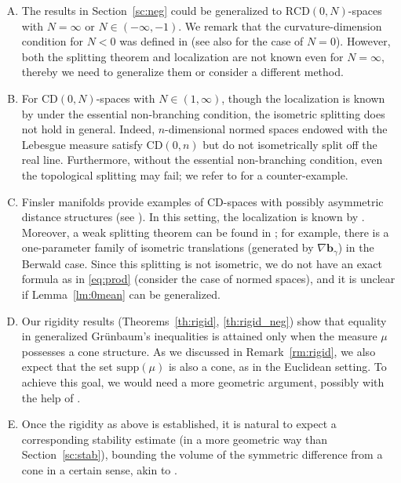 \documentclass[sts]{imsart}
\theoremstyle{definition}
\theoremstyle{remark}
\newcommand{\bb}{\mathbf{b}}
\newcommand{\dist}{\mathrm{d}}
\newcommand{\ve}{\varepsilon}
\newcommand{\CD}{\mathrm{CD}}
\newcommand{\RCD}{\mathrm{RCD}}
\newcommand{\supp}{\mathrm{supp}}
\newcommand*\diff{\mathop{}\!\mathrm{d}}
\begin{document}
\begin{enumerate}[(A)]
\item
The results in Section~\ref{sc:neg} could be generalized to $\RCD(0,N)$-spaces with $N=\infty$ or $N \in (-\infty,-1)$.
We remark that the curvature-dimension condition for $N<0$ was defined in \cite{Oneg} (see also \cite{Oneedle} for the case of $N=0$).
However, both the splitting theorem and localization are not known even for $N=\infty$, thereby we need to generalize them or consider a different method.

\item\label{prob:B}
For $\CD(0,N)$-spaces with $N \in (1,\infty)$, though the localization is known by \cite{CM} under the essential non-branching condition, the isometric splitting does not hold in general.
Indeed, $n$-dimensional normed spaces endowed with the Lebesgue measure satisfy $\CD(0,n)$ but do not isometrically split off the real line.
Furthermore, without the essential non-branching condition, even the topological splitting may fail; we refer to \cite{M} for a counter-example.

\item
Finsler manifolds provide examples of $\CD$-spaces with possibly asymmetric distance structures (see \cite{Oint,Obook}).
In this setting, the localization is known by \cite{CM,Oneedle}.
Moreover, a weak splitting theorem can be found in \cite{Osplit};
for example, there is a one-parameter family of isometric translations (generated by $\nabla \bb_\gamma$) in the Berwald case.
Since this splitting is not isometric, we do not have an exact formula as in \eqref{eq:prod} (consider the case of normed spaces), and it is unclear if Lemma~\ref{lm:0mean} can be generalized.

\item
Our rigidity results (Theorems~\ref{th:rigid}, \ref{th:rigid_neg}) show that equality in generalized Gr\"unbaum's inequalities is attained only when the measure $\mu$ possesses a cone structure.
As we discussed in Remark~\ref{rm:rigid}, we also expect that the set $\supp(\mu)$ is also a cone, as in the Euclidean setting.
To achieve this goal, we would need a more geometric argument, possibly with the help of \cite{BK,de2016volume}.

\item
Once the rigidity as above is established, it is natural to expect a corresponding stability estimate (in a more geometric way than Section~\ref{sc:stab}), bounding the volume of the symmetric difference from a cone in a certain sense, akin to \cite{Gr00}.
\end{enumerate}
\end{document}

